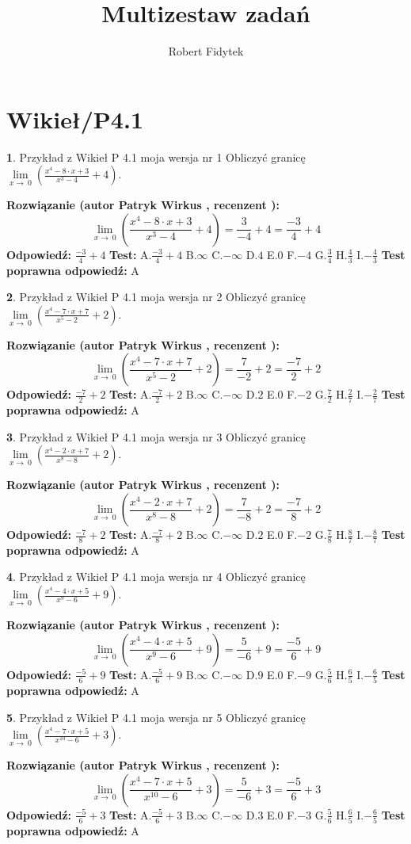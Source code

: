 \documentclass[12pt, a4paper]{article}
\title{Multizestaw zadań}
\author{Robert Fidytek}
\date{}
\theoremstyle{definition} %
\newtheorem{zad}{}
\newcommand{\kategoria}[1]{\section{#1}}
\newcommand{\zadStart}[1]{\begin{zad}#1\newline}
\newcommand{\zadStop}{\end{zad}}
\newcommand{\rozwStart}[2]{\noindent \textbf{Rozwiązanie (autor #1 , recenzent #2): }\newline}
\newcommand{\rozwStop}{\newline}
\newcommand{\odpStart}{\noindent \textbf{Odpowiedź:}\newline}
\newcommand{\odpStop}{\newline}
\newcommand{\testStart}{\noindent \textbf{Test:}\newline}
\newcommand{\testStop}{\newline}
\newcommand{\kluczStart}{\noindent \textbf{Test poprawna odpowiedź:}\newline}
\newcommand{\kluczStop}{\newline}
\begin{document}
\maketitle

\kategoria{Wikieł/P4.1}


\zadStart{Przykład z Wikieł P 4.1 moja wersja nr 1}
Obliczyć granicę $\lim\limits_{x\to\ 0}(\frac{x^{4}-8 \cdot x +3}{x^{3}-4}+4)$.
\zadStop
\rozwStart{Patryk Wirkus}{}
$$\lim\limits_{x\to\ 0}(\frac{x^{4}-8 \cdot x +3}{x^{3}-4}+4)=\frac{3}{-4}+4=\frac{-3}{4}+4$$
\rozwStop
\odpStart
$\frac{-3}{4}+4$
\odpStop
\testStart
A.$\frac{-3}{4}+4$
B.$\infty$
C.$-\infty$
D.$4$
E.$0$
F.$-4$
G.$\frac{3}{4}$
H.$\frac{4}{3}$
I.$-\frac{4}{3}$
\testStop
\kluczStart
A
\kluczStop



\zadStart{Przykład z Wikieł P 4.1 moja wersja nr 2}
Obliczyć granicę $\lim\limits_{x\to\ 0}(\frac{x^{4}-7 \cdot x +7}{x^{5}-2}+2)$.
\zadStop
\rozwStart{Patryk Wirkus}{}
$$\lim\limits_{x\to\ 0}(\frac{x^{4}-7 \cdot x +7}{x^{5}-2}+2)=\frac{7}{-2}+2=\frac{-7}{2}+2$$
\rozwStop
\odpStart
$\frac{-7}{2}+2$
\odpStop
\testStart
A.$\frac{-7}{2}+2$
B.$\infty$
C.$-\infty$
D.$2$
E.$0$
F.$-2$
G.$\frac{7}{2}$
H.$\frac{2}{7}$
I.$-\frac{2}{7}$
\testStop
\kluczStart
A
\kluczStop



\zadStart{Przykład z Wikieł P 4.1 moja wersja nr 3}
Obliczyć granicę $\lim\limits_{x\to\ 0}(\frac{x^{4}-2 \cdot x +7}{x^{8}-8}+2)$.
\zadStop
\rozwStart{Patryk Wirkus}{}
$$\lim\limits_{x\to\ 0}(\frac{x^{4}-2 \cdot x +7}{x^{8}-8}+2)=\frac{7}{-8}+2=\frac{-7}{8}+2$$
\rozwStop
\odpStart
$\frac{-7}{8}+2$
\odpStop
\testStart
A.$\frac{-7}{8}+2$
B.$\infty$
C.$-\infty$
D.$2$
E.$0$
F.$-2$
G.$\frac{7}{8}$
H.$\frac{8}{7}$
I.$-\frac{8}{7}$
\testStop
\kluczStart
A
\kluczStop



\zadStart{Przykład z Wikieł P 4.1 moja wersja nr 4}
Obliczyć granicę $\lim\limits_{x\to\ 0}(\frac{x^{4}-4 \cdot x +5}{x^{9}-6}+9)$.
\zadStop
\rozwStart{Patryk Wirkus}{}
$$\lim\limits_{x\to\ 0}(\frac{x^{4}-4 \cdot x +5}{x^{9}-6}+9)=\frac{5}{-6}+9=\frac{-5}{6}+9$$
\rozwStop
\odpStart
$\frac{-5}{6}+9$
\odpStop
\testStart
A.$\frac{-5}{6}+9$
B.$\infty$
C.$-\infty$
D.$9$
E.$0$
F.$-9$
G.$\frac{5}{6}$
H.$\frac{6}{5}$
I.$-\frac{6}{5}$
\testStop
\kluczStart
A
\kluczStop



\zadStart{Przykład z Wikieł P 4.1 moja wersja nr 5}
Obliczyć granicę $\lim\limits_{x\to\ 0}(\frac{x^{4}-7 \cdot x +5}{x^{10}-6}+3)$.
\zadStop
\rozwStart{Patryk Wirkus}{}
$$\lim\limits_{x\to\ 0}(\frac{x^{4}-7 \cdot x +5}{x^{10}-6}+3)=\frac{5}{-6}+3=\frac{-5}{6}+3$$
\rozwStop
\odpStart
$\frac{-5}{6}+3$
\odpStop
\testStart
A.$\frac{-5}{6}+3$
B.$\infty$
C.$-\infty$
D.$3$
E.$0$
F.$-3$
G.$\frac{5}{6}$
H.$\frac{6}{5}$
I.$-\frac{6}{5}$
\testStop
\kluczStart
A
\kluczStop
\end{document}
